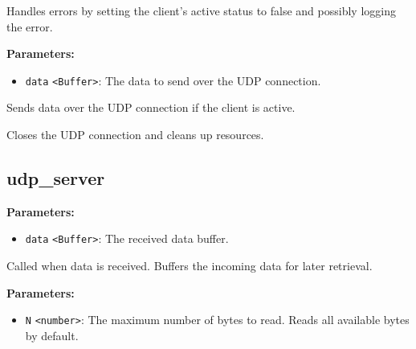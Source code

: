 \documentclass[12pt,a4paper]{article}
\begin{document}
\noindent Handles errors by setting the client's active status to false and possibly logging the error.

\vspace{5mm}
\noindent {}


\noindent \textbf{Parameters:}
\begin{itemize}
  \item \texttt{data} \texttt{<Buffer>}: The data to send over the UDP connection.
\end{itemize}

\noindent Sends data over the UDP connection if the client is active.

\vspace{5mm}
\noindent {}


\noindent Closes the UDP connection and cleans up resources.


\subsection{udp\_server}
\vspace{5mm}
\noindent {}


\noindent \textbf{Parameters:}
\begin{itemize}
  \item \texttt{data} \texttt{<Buffer>}: The received data buffer.
\end{itemize}

\noindent Called when data is received. Buffers the incoming data for later retrieval.

\vspace{5mm}
\noindent {}


\noindent \textbf{Parameters:}
\begin{itemize}
  \item \texttt{N} \texttt{<number>}: The maximum number of bytes to read. Reads all available bytes by default.
\end{itemize}
\end{document}
